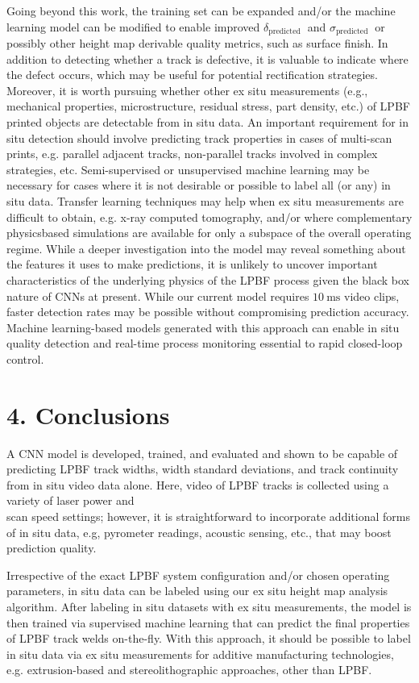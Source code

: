 \documentclass[10pt]{article}
\begin{document}
Going beyond this work, the training set can be expanded and/or the machine learning model can be modified to enable improved $\delta_{\text {predicted }}$ and $\sigma_{\text {predicted }}$ or possibly other height map derivable quality metrics, such as surface finish. In addition to detecting whether a track is defective, it is valuable to indicate where the defect occurs, which may be useful for potential rectification strategies. Moreover, it is worth pursuing whether other ex situ measurements (e.g., mechanical properties, microstructure, residual stress, part density, etc.) of LPBF printed objects are detectable from in situ data. An important requirement for in situ detection should involve predicting track properties in cases of multi-scan prints, e.g. parallel adjacent tracks, non-parallel tracks involved in complex strategies, etc. Semi-supervised or unsupervised machine learning may be necessary for cases where it is not desirable or possible to label all (or any) in situ data. Transfer learning techniques may help when ex situ measurements are difficult to obtain, e.g. x-ray computed tomography, and/or where complementary physicsbased simulations are available for only a subspace of the overall operating regime. While a deeper investigation into the model may reveal something about the features it uses to make predictions, it is unlikely to uncover important characteristics of the underlying physics of the LPBF process given the black box nature of CNNs at present. While our current model requires $10 \mathrm{~ms}$ video clips, faster detection rates may be possible without compromising prediction accuracy. Machine learning-based models generated with this approach can enable in situ quality detection and real-time process monitoring essential to rapid closed-loop control.

\section*{4. Conclusions}
A CNN model is developed, trained, and evaluated and shown to be capable of predicting LPBF track widths, width standard deviations, and track continuity from in situ video data alone. Here, video of LPBF tracks is collected using a variety of laser power and\\
scan speed settings; however, it is straightforward to incorporate additional forms of in situ data, e.g, pyrometer readings, acoustic sensing, etc., that may boost prediction quality.

Irrespective of the exact LPBF system configuration and/or chosen operating parameters, in situ data can be labeled using our ex situ height map analysis algorithm. After labeling in situ datasets with ex situ measurements, the model is then trained via supervised machine learning that can predict the final properties of LPBF track welds on-the-fly. With this approach, it should be possible to label in situ data via ex situ measurements for additive manufacturing technologies, e.g. extrusion-based and stereolithographic approaches, other than LPBF.
\end{document}
